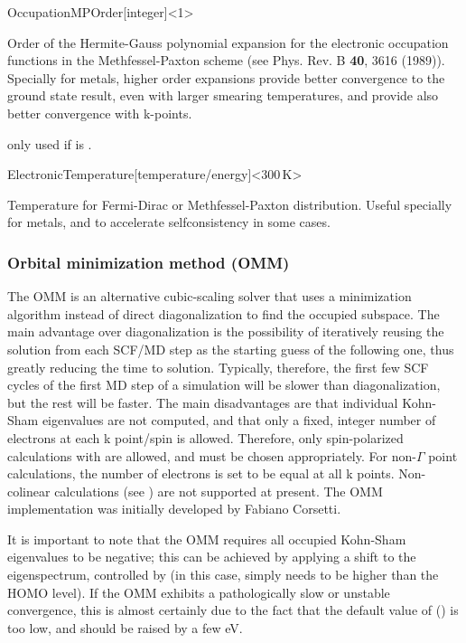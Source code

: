 \begin{fdfentry}{OccupationMPOrder}[integer]<1>
  
  Order of the Hermite-Gauss polynomial expansion for the electronic
  occupation functions in the Methfessel-Paxton scheme (see
  Phys. Rev. B \textbf{40}, 3616 (1989)).  Specially for metals,
  higher order expansions provide better convergence to the ground
  state result, even with larger smearing temperatures, and provide
  also better convergence with k-points.

  \note only used if  is .

\end{fdfentry}


\begin{fdfentry}{ElectronicTemperature}[temperature/energy]<$300\,\mathrm{K}$>
  
  Temperature for Fermi-Dirac or Methfessel-Paxton
  distribution. Useful specially for metals, and to accelerate
  selfconsistency in some cases.

\end{fdfentry}



\subsubsection{Orbital minimization method (OMM)}
\label{SolverOMM}

The OMM is an alternative cubic-scaling solver that uses a
minimization algorithm instead of direct diagonalization to find the
occupied subspace.  The main advantage over diagonalization is the
possibility of iteratively reusing the solution from each SCF/MD step
as the starting guess of the following one, thus greatly reducing the
time to solution. Typically, therefore, the first few SCF cycles of
the first MD step of a simulation will be slower than diagonalization,
but the rest will be faster. The main disadvantages are that
individual Kohn-Sham eigenvalues are not computed, and that only a
fixed, integer number of electrons at each k point/spin is
allowed. Therefore, only spin-polarized calculations with
 are allowed, and  must be chosen
appropriately. For non-$\Gamma$ point calculations, the number of
electrons is set to be equal at all k points. Non-colinear
calculations (see ) are not supported at present.
The OMM implementation was initially developed by Fabiano Corsetti.

It is important to note that the OMM requires all occupied Kohn-Sham
eigenvalues to be negative; this can be achieved by applying a shift
to the eigenspectrum, controlled by  (in this case,
 simply needs to be higher than the HOMO level). If the
OMM exhibits a pathologically slow or unstable convergence, this is
almost certainly due to the fact that the default value of
 () is too low, and should be raised by
a few eV.

